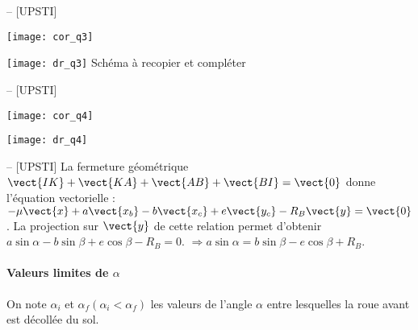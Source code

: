 \ifprof
\begin{corrige}-- [UPSTI] ~\\
\begin{center}
\texttt{[image: cor\_q3]}
\end{center}
\end{corrige}
\else
\begin{center}
\texttt{[image: dr\_q3]}
Schéma à recopier et compléter
\end{center}

\fi

\ifprof
\begin{corrige}-- [UPSTI]
\begin{center}
\texttt{[image: cor\_q4]}
\end{center}
\end{corrige}
\else
\begin{center}
\texttt{[image: dr\_q4]}
\end{center}
\fi



\ifprof
\begin{corrige}-- [UPSTI]
La fermeture géométrique $\vect{IK}+\vect{KA}+\vect{AB}+\vect{BI}=\vect{0}$ donne l’équation vectorielle :
$-\mu\vect{x}+a\vect{x_b}-b\vect{x_c}+e\vect{y_c}-R_B \vect{y} = \vect{0}$.
La projection sur  $\vect{y}$ de cette relation permet d’obtenir $a\sin\alpha -b\sin\beta +e\cos\beta-R_B=0$.
$\Rightarrow  a\sin\alpha =b\sin\beta -e\cos\beta +R_B$.

\end{corrige}
\else
\fi

\paragraph*{Valeurs limites de \(\alpha\)} On note \(\alpha_{i}\) et \(\alpha_{f}\left(\alpha_{i}<\alpha_{f}\right)\) les valeurs de l'angle \(\alpha\) entre lesquelles la roue avant est décollée du sol.

